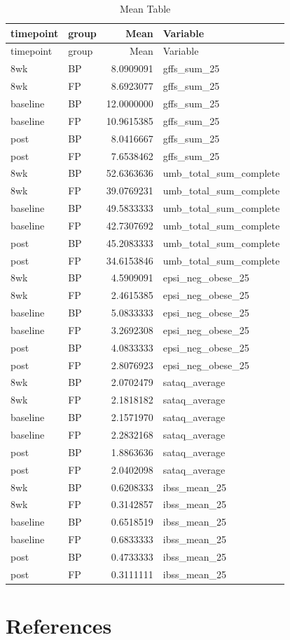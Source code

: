 \documentclass[
  letterpaper,
  DIV=11,
  numbers=noendperiod]{scrreprt}
\newlength{\cslhangindent}
\newlength{\cslentryspacingunit} %
\newenvironment{CSLReferences}[2] %
 {%
  \setlength{\parindent}{0pt}
  \ifodd #1
  \let\oldpar\par
  \def\par{\hangindent=\cslhangindent\oldpar}
  \fi
  \setlength{\parskip}{#2\cslentryspacingunit}
 }%
 {}
\begin{document}
\begin{longtable}[]{@{}llrl@{}}
\caption{Mean Table}\tabularnewline
\toprule()
timepoint & group & Mean & Variable \\
\midrule()
\endfirsthead
\toprule()
timepoint & group & Mean & Variable \\
\midrule()
\endhead
8wk & BP & 8.0909091 & gffs\_sum\_25 \\
8wk & FP & 8.6923077 & gffs\_sum\_25 \\
baseline & BP & 12.0000000 & gffs\_sum\_25 \\
baseline & FP & 10.9615385 & gffs\_sum\_25 \\
post & BP & 8.0416667 & gffs\_sum\_25 \\
post & FP & 7.6538462 & gffs\_sum\_25 \\
8wk & BP & 52.6363636 & umb\_total\_sum\_complete \\
8wk & FP & 39.0769231 & umb\_total\_sum\_complete \\
baseline & BP & 49.5833333 & umb\_total\_sum\_complete \\
baseline & FP & 42.7307692 & umb\_total\_sum\_complete \\
post & BP & 45.2083333 & umb\_total\_sum\_complete \\
post & FP & 34.6153846 & umb\_total\_sum\_complete \\
8wk & BP & 4.5909091 & epsi\_neg\_obese\_25 \\
8wk & FP & 2.4615385 & epsi\_neg\_obese\_25 \\
baseline & BP & 5.0833333 & epsi\_neg\_obese\_25 \\
baseline & FP & 3.2692308 & epsi\_neg\_obese\_25 \\
post & BP & 4.0833333 & epsi\_neg\_obese\_25 \\
post & FP & 2.8076923 & epsi\_neg\_obese\_25 \\
8wk & BP & 2.0702479 & sataq\_average \\
8wk & FP & 2.1818182 & sataq\_average \\
baseline & BP & 2.1571970 & sataq\_average \\
baseline & FP & 2.2832168 & sataq\_average \\
post & BP & 1.8863636 & sataq\_average \\
post & FP & 2.0402098 & sataq\_average \\
8wk & BP & 0.6208333 & ibss\_mean\_25 \\
8wk & FP & 0.3142857 & ibss\_mean\_25 \\
baseline & BP & 0.6518519 & ibss\_mean\_25 \\
baseline & FP & 0.6833333 & ibss\_mean\_25 \\
post & BP & 0.4733333 & ibss\_mean\_25 \\
post & FP & 0.3111111 & ibss\_mean\_25 \\
\bottomrule()
\end{longtable}


\hypertarget{references}{%
\chapter*{References}\label{references}}

\hypertarget{refs}{}
\begin{CSLReferences}{0}{0}
\end{CSLReferences}
\end{document}
